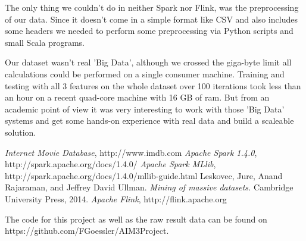 \documentclass{vldb}
\begin{document}
\par The only thing we couldn't do in neither Spark nor Flink, was the preprocessing of our data. Since it doesn't come in a simple format like CSV and also includes some headers we needed to perform some preprocessing via Python scripts and small Scala programs. 
\par Our dataset wasn't real 'Big Data', although we crossed the giga-byte limit all calculations could be performed on a single consumer machine. Training and testing with all 3 features on the whole dataset over 100 iterations took less than an hour on a recent quad-core machine with 16 GB of ram. But from an academic point of view it was very interesting to work with those 'Big Data' systems and get some hands-on experience with real data and build a scaleable solution.


\begin{thebibliography}{9} 
 \emph{Internet Movie Database}, http://www.imdb.com
 \emph{Apache Spark 1.4.0}, http://spark.apache.org/docs/1.4.0/
 \emph{Apache Spark MLlib}, http://spark.apache.org/docs/1.4.0/mllib-guide.html
 Leskovec, Jure, Anand Rajaraman, and Jeffrey David Ullman. \emph{Mining of massive datasets.} Cambridge University Press, 2014.
 \emph{Apache Flink}, http://flink.apache.org
\end{thebibliography}

\bigskip
\par The code for this project as well as the raw result data can be found on https://github.com/FGoessler/AIM3Project.
\end{document}
